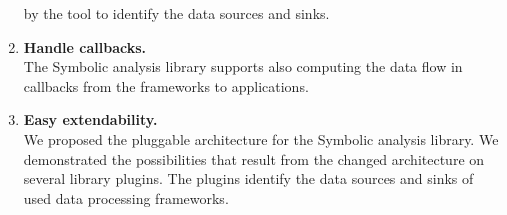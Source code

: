 \begin{enumerate}
    by the \ToolName tool to identify the data sources and sinks.
  \item \textbf{Handle callbacks.} \\
    The Symbolic analysis library supports also computing the data flow in callbacks
    from the frameworks to applications.
  \item \textbf{Easy extendability.} \\
    We proposed the pluggable architecture for the Symbolic analysis library.
    We demonstrated the possibilities that result from the changed architecture
    on several library plugins. The plugins identify the data sources and sinks
    of used data processing frameworks.
\end{enumerate}

